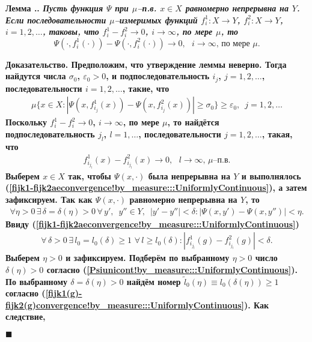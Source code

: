 \documentclass{report}
\newcounter{lem}[section]
\renewcommand{\thelem}{\thesection.\arabic{lem}}
\newenvironment{Lemma}{\par\refstepcounter{lem}\bf Лемма \thelem. \it}{\rm\par}
\newenvironment{Proof}{\par\noindent\bf Доказательство.\rm}{ $\blacksquare$\par}
\begin{document}
\begin{Lemma}\label{fi1fi2covergence->Psi(g,fi1)-Psi(g,fi2)convergence!by_measure:::UniformlyContinuous}
Пусть функция $\Psi$ при $\mu$--п.в. $x\in X$ равномерно непрерывна на $Y$. Если последовательности $\mu$--измеримых функций $f_i^1\colon X\to Y$, $f_i^2\colon X\to Y$, $i=1,2,\dots$,
таковы, что $f_i^1-f^2_i\to0$, $i\to\infty$, по мере $\mu$,
то
$$
\Psi(\cdot,f_i^1(\cdot))-\Psi(\cdot,f_i^2(\cdot))\to0,\text{ $i\to\infty$, по мере $\mu$.}
$$
\end{Lemma}
\begin{Proof}
Предположим, что утверждение леммы неверно. Тогда найдутся числа $\sigma_0$, $\varepsilon_0>0$, и подпоследовательность $i_j$, $j=1,2,\dots$, последовательности $i=1,2,\dots$, такие, что
\begin{gather}\label{notPsi(g,fi1)-Psi(g,fi2)convergence!by_measure:::UniformlyContinuous}
\mu\{x\in X:|\Psi(x,f^1_{i_j}(x))-\Psi(x,f^2_{i_j}(x))|\geqslant\sigma_0\}\geqslant\varepsilon_0,\,\,\,j=1,2,\dots
\end{gather}
Поскольку $f_i^1-f_i^2\to0$, $i\to\infty$, по мере $\mu$, то найдётся подпоследовательность $j_l$, $l=1,\dots$, последовательности $j=1,2,\dots$, такая, что
\begin{gather}\label{fijk1-fijk2aeconvergence!by_measure:::UniformlyContinuous}
f_{i_{j_l}}^1(x)-f_{i_{j_l}}^2(x)\to0,\text{ $l\to\infty$, $\mu$--п.в}.
\end{gather}
Выберем $x\in X$ так, чтобы $\Psi(x,\cdot)$ была непрерывна на $Y$ и выполнялось (\ref{fijk1-fijk2aeconvergence!by_measure:::UniformlyContinuous}), а затем зафиксируем. Так как
$\Psi(x,\cdot)$ равномерно непрерывна на $Y$, то
\begin{gather}\label{Psiunicont!by_measure:::UniformlyContinuous}
\forall\eta>0\,\exists\,\delta=\delta(\eta)>0\,\forall\,y',\,\,\,y''\in Y,\,\,\,|y'-y''|<\delta:|\Psi(x,y')-\Psi(x,y'')|<\eta.
\end{gather}
Ввиду (\ref{fijk1-fijk2aeconvergence!by_measure:::UniformlyContinuous})
\begin{gather}\label{fijk1(g)-fijk2(g)convergence!by_measure:::UniformlyContinuous}
\forall\,\delta>0\,\exists\,l_0=l_0(\delta)\geqslant1\,\,\forall\,l\geqslant l_0(\delta):|f_{i_{j_l}}^1(g)-f_{i_{j_l}}^2(g)|<\delta.
\end{gather}
Выберем $\eta>0$ и зафиксируем. Подберём по выбранному $\eta>0$ число $\delta(\eta)>0$ согласно (\ref{Psiunicont!by_measure:::UniformlyContinuous}). По выбранному $\delta=\delta(\eta)>0$
найдём номер $\tilde{l}_0(\eta)\equiv l_0(\delta(\eta))\geqslant1$ согласно (\ref{fijk1(g)-fijk2(g)convergence!by_measure:::UniformlyContinuous}). Как следствие,

\end{Proof}
\end{document}
